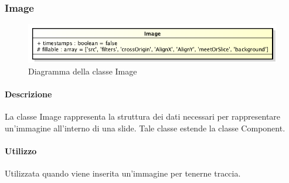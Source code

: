 \subsubsection{Image}

	\begin{figure}[h]
		\centering
		\includegraphics[width=0.8\linewidth]{img/back_end_premi_model_image}
		\caption[Diagramma della classe Image]{Diagramma della classe Image}
		\label{fig:back_end_premi_model_image}
	\end{figure}


	\paragraph{Descrizione}
	La classe Image rappresenta la struttura dei dati necessari per rappresentare un'immagine all'interno di una \gls{slide}. Tale classe estende la classe Component.
	
	\paragraph{Utilizzo}
	Utilizzata quando viene inserita un'immagine per tenerne traccia.
	
